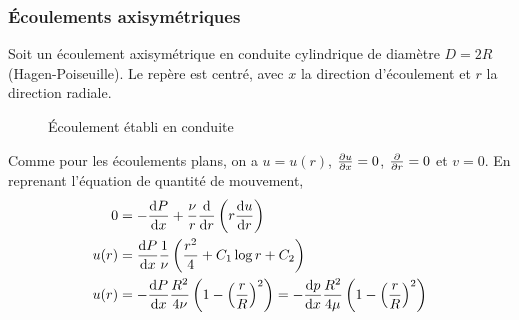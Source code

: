 \documentclass[a4paper,11pt]{report}
\newcommand{\recip}[1]{\frac{1}{#1}}
\begin{document}
      \subsubsection{Écoulements axisymétriques}
        Soit un écoulement axisymétrique en conduite cylindrique de diamètre $D=2R$ (Hagen-Poiseuille).  Le repère est centré, avec $x$ la direction d'écoulement et $r$ la direction radiale.
        \begin{figure}[!h]
          \centering
          
          \caption{Écoulement établi en conduite}
          \label{fig:Hagen}
        \end{figure}
        Comme pour les écoulements plans, on a $u = u(r)$, $\pdv{u}{x} = 0$, $\pdv{}{r}(rv) = 0$ et $v = 0$. En reprenant l'équation de quantité de mouvement,
        \begin{equation}
          \begin{aligned}
            0 &= -\dv{P}{x} + \frac{\nu}{r} \dv{}{r}\left(r\dv{u}{r}\right)\\
            u(r) &= \dv{P}{x} \recip{\nu} \left(\frac{r^2}{4} + C_1 \log r + C_2 \right)\\
            u(r) &= - \dv{P}{x} \frac{R^2}{4\nu} \left(1 - \left(\frac{r}{R}\right)^2\right) = - \dv{p}{x} \frac{R^2}{4\mu} \left(1 - \left(\frac{r}{R}\right)^2\right)
          \end{aligned}
        \end{equation}
\end{document}

